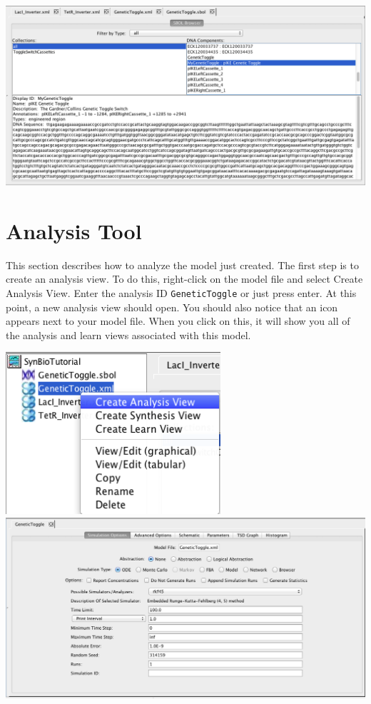 \documentclass[titlepage,11pt]{article}
\begin{document}
\begin{center}
\includegraphics[width=160mm]{screenshots/SBOLBrowserGT2}
\end{center}

\section{Analysis Tool}

This section describes how to analyze the model just created.  The first step is to create an analysis view.  To do this, right-click on the model file and select Create Analysis View.  Enter the analysis ID {\tt GeneticToggle} or just press enter.  At this point, a new analysis view should open.  You should also notice that an icon appears next to your model file.  When you click on this, it will show you all of the analysis and learn views associated with this model.

\begin{center}
\includegraphics[height=60mm]{screenshots/createAnalysisViewGT}\\
\includegraphics[width=160mm]{screenshots/analysisViewGT}
\end{center}
\end{document}
